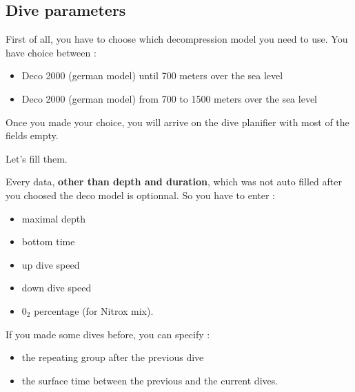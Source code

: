 \documentclass[10pt,a4paper,titlepage]{report}
\begin{document}
\subsection{Dive parameters}
First of all, you have to choose which decompression model you need to use.
You have choice between :
\begin{itemize}
\item Deco 2000 (german model) until 700 meters over the sea level
\item Deco 2000 (german model) from 700 to 1500 meters over the sea level
\end{itemize}
Once you made your choice, you will arrive on the dive planifier with most of the fields empty.

Let's fill them.


Every data, \textbf{other than depth and duration}, which was not auto filled after you choosed the deco model is optionnal.
So you have to enter :
\begin{itemize}
	\item maximal depth
	\item bottom time
	\item up dive speed
	\item down dive speed
	\item $0_{2}$ percentage (for Nitrox mix).
\end{itemize}

If you made some dives before, you can specify :
\begin{itemize}
	\item the repeating group after the previous dive
	\item the surface time between the previous and the current dives.
\end{itemize}
\end{document}
